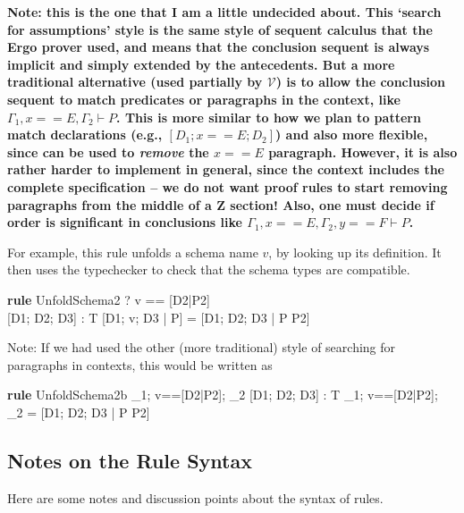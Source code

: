 \documentclass{article}
\newcommand{\V}{\mathcal{V}}
\newenvironment{zedrule}[1]{\par\textbf{rule }#1\vspace{-2ex}\infrule}{\endinfrule}
\newcommand{\derives}{\derive{}}
\newcommand{\Context}{\Gamma}
\newcommand{\proviso}{\raisebox{0.5ex}{${}_{\blacktriangleright}\ $}}%
\begin{document}
\begin{description}
  \textbf{Note: this is the one that I am a little undecided about.
  This `search for assumptions' style is the same style of sequent
  calculus that the Ergo prover used, and means that the conclusion
  sequent is always implicit and simply extended by the antecedents.
  But a more traditional alternative (used partially by $\V$)
  is to allow the conclusion
  sequent to match predicates or paragraphs in the context,
  like $\Context_1, x==E, \Context_2 \vdash P$.
  This is more similar to how we plan to pattern match declarations
  (e.g., $[D_1;x==E;D_2]$) and also more flexible,
  since can be used to \emph{remove} the $x==E$ paragraph.
  However, it is also rather harder to implement in general,
  since the context includes the complete specification -- we
  do not want proof rules to start removing paragraphs from the middle of
  a Z section!  
  Also, one must decide if order is significant in conclusions like
  $\Context_1, x==E, \Context_2, y==F \vdash P$.
  }
\end{description}

For example, this rule unfolds a schema name $v$, by looking
up its definition.  It then uses the typechecker to check that 
the schema types are compatible.

\begin{zedrule}{UnfoldSchema2}
   \proviso? v == [D2|P2] \\
   \proviso [D1; D2; D3] : T
\derives
   [D1; v; D3 | P]  =  [D1; D2; D3 | P \land P2]
\end{zedrule}

Note: If we had used the other (more traditional) style of searching
for paragraphs in contexts, this would be written as
\begin{zedrule}{UnfoldSchema2b}
   \Context_1; v==[D2|P2]; \Context_2 \vdash
      \proviso [D1; D2; D3] : T
\derives
   \Context_1; v==[D2|P2]; \Context_2 \vdash
      [D1; v; D3 | P]  =  [D1; D2; D3 | P \land P2]
\end{zedrule}



\subsection{Notes on the Rule Syntax}

Here are some notes and discussion points about the syntax of rules.
\end{document}
